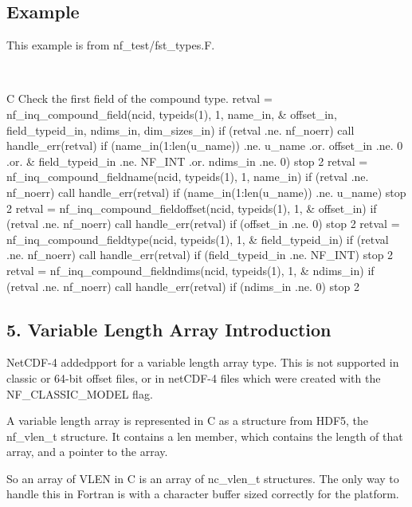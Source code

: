 \subsection*{Example }

This example is from nf\+\_\+test/fst\+\_\+types.\+F.

 


\begin{DoxyCode}
C     Check the first field of the compound type.
      retval = nf\_inq\_compound\_field(ncid, typeids(1), 1, name\_in,
     &     offset\_in, field\_typeid\_in, ndims\_in, dim\_sizes\_in)
      if (retval .ne. nf\_noerr) call handle\_err(retval)
      if (name\_in(1:len(u\_name)) .ne. u\_name .or. offset\_in .ne. 0 .or.
     &     field\_typeid\_in .ne. NF\_INT .or. ndims\_in .ne. 0) stop 2
      retval = nf\_inq\_compound\_fieldname(ncid, typeids(1), 1, name\_in)
      if (retval .ne. nf\_noerr) call handle\_err(retval)
      if (name\_in(1:len(u\_name)) .ne. u\_name) stop 2
      retval = nf\_inq\_compound\_fieldoffset(ncid, typeids(1), 1,
     &     offset\_in)
      if (retval .ne. nf\_noerr) call handle\_err(retval)
      if (offset\_in .ne. 0) stop 2
      retval = nf\_inq\_compound\_fieldtype(ncid, typeids(1), 1,
     &     field\_typeid\_in)
      if (retval .ne. nf\_noerr) call handle\_err(retval)
      if (field\_typeid\_in .ne. NF\_INT) stop 2
      retval = nf\_inq\_compound\_fieldndims(ncid, typeids(1), 1,
     &     ndims\_in)
      if (retval .ne. nf\_noerr) call handle\_err(retval)
      if (ndims\_in .ne. 0) stop 2
\end{DoxyCode}


\subsection*{5. Variable Length Array Introduction }

Net\+C\+D\+F-\/4 addedpport for a variable length array type. This is not supported in classic or 64-\/bit offset files, or in net\+C\+D\+F-\/4 files which were created with the N\+F\+\_\+\+C\+L\+A\+S\+S\+I\+C\+\_\+\+M\+O\+D\+EL flag.

A variable length array is represented in C as a structure from H\+D\+F5, the nf\+\_\+vlen\+\_\+t structure. It contains a len member, which contains the length of that array, and a pointer to the array.

So an array of V\+L\+EN in C is an array of nc\+\_\+vlen\+\_\+t structures. The only way to handle this in Fortran is with a character buffer sized correctly for the platform.

